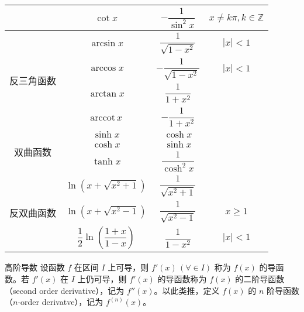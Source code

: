 \begin{table}
\begin{tabular}{|c|c|c|c|}
                                & $\cot x$                                            & $-\dfrac{1}{\sin^{2}x}$      & $x \ne k\pi, k\in \mathbb{Z}$                  \\[5pt]
    \hline
    \multirow{4}{*}{反三角函数} & $\arcsin x$                                         & $\dfrac{1}{\sqrt{1 - x^2}}$  & $|x| < 1$                                      \\
                                & $\arccos x$                                         & $-\dfrac{1}{\sqrt{1 - x^2}}$ & $|x| < 1$                                      \\
                                & $\arctan x$                                         & $\dfrac{1}{1 + x^2}$         &                                                \\
                                & $\mathrm{arccot}\, x$                               & $-\dfrac{1}{1 + x^2}$        &                                                \\[5pt]
    \hline
    \multirow{3}{*}{双曲函数}   & $\sinh x$                                           & $\cosh x$                    &                                                \\
                                & $\cosh x$                                           & $\sinh x$                    &                                                \\
                                & $\tanh x$                                           & $\dfrac{1}{\cosh^{2}x}$      &                                                \\[5pt]
    \hline
    \multirow{3}{*}{反双曲函数} & $\ln (x + \sqrt{x^2 + 1})$                          & $\dfrac{1}{\sqrt{x^2 + 1}}$  &                                                \\
                                & $\ln (x + \sqrt{x^2 - 1})$                          & $\dfrac{1}{\sqrt{x^2 - 1}}$  & $x \geqslant 1$                                \\
                                & $\dfrac{1}{2}\ln \left(\dfrac{1 + x}{1 - x}\right)$ & $\dfrac{1}{1 - x^2}$         & $|x| < 1$                                      \\[5pt]
    \hline
  \end{tabular}
\end{table}

\begin{definition}{高阶导数}
  设函数 $f$ 在区间 $I$ 上可导，则 $f'(x)\,(\forall \in I)$ 称为 $f(x)$ 的导函数。若 $f'(x)$ 在 $I$ 上仍可导，则 $f'(x)$ 的导函数称为 $f(x)$ 的二阶导函数（second order derivative），记为 $f''(x)$。以此类推，定义 $f(x)$ 的 $n$ 阶导函数（$n$-order derivatve），记为 $f^{(n)}(x)$。
\end{definition}


